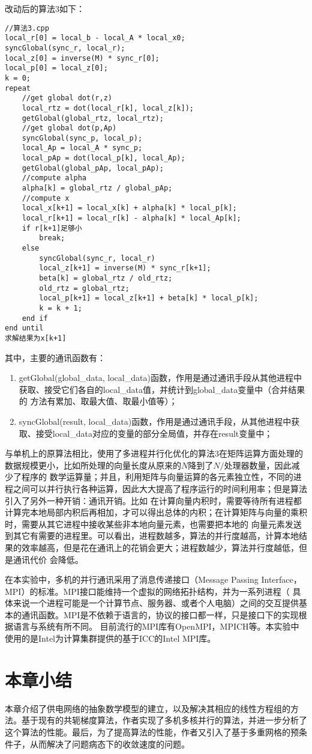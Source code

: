 改动后的算法3如下：
\begin{lstlisting}
//算法3.cpp
local_r[0] = local_b - local_A * local_x0;
syncGlobal(sync_r, local_r);
local_z[0] = inverse(M) * sync_r[0];
local_p[0] = local_z[0];
k = 0;
repeat
    //get global dot(r,z)
    local_rtz = dot(local_r[k], local_z[k]);
    getGlobal(global_rtz, local_rtz);
    //get global dot(p,Ap)
    syncGlobal(sync_p, local_p);
    local_Ap = local_A * sync_p;
    local_pAp = dot(local_p[k], local_Ap);
    getGlobal(global_pAp, local_pAp);
    //compute alpha
    alpha[k] = global_rtz / global_pAp;
    //compute x
    local_x[k+1] = local_x[k] + alpha[k] * local_p[k];
    local_r[k+1] = local_r[k] - alpha[k] * local_Ap[k];
    if r[k+1]足够小
        break;
    else
        syncGlobal(sync_r, local_r)
        local_z[k+1] = inverse(M) * sync_r[k+1];
        beta[k] = global_rtz / old_rtz;
        old_rtz = global_rtz;
        local_p[k+1] = local_z[k+1] + beta[k] * local_p[k];
        k = k + 1;
    end if
end until
求解结果为x[k+1]
\end{lstlisting}
其中，主要的通讯函数有：
\begin{enumerate}
    \item getGlobal(global\_data, local\_data)函数，作用是通过通讯手段从其他进程中获取、接受它们各自的local\_data值，并统计到global\_data变量中（合并结果的
    方法有累加、取最大值、取最小值等）；
    \item syncGlobal(result, local\_data)函数，作用是通过通讯手段，从其他进程中获取、接受local\_data对应的变量的部分全局值，并存在result变量中；
\end{enumerate}

与单机上的原算法相比，使用了多进程并行化优化的算法3在矩阵运算方面处理的数据规模更小，比如所处理的向量长度从原来的$N$降到了$N/\text{处理器数量}$，因此减少了程序的
数学运算量；并且，利用矩阵与向量运算的各元素独立性，不同的进程之间可以并行执行各种运算，因此大大提高了程序运行的时间利用率；但是算法引入了另外一种开销：通讯开销。比如
在计算向量内积时，需要等待所有进程都计算完本地局部内积后再相加，才可以得出总体的内积；在计算矩阵与向量的乘积时，需要从其它进程中接收某些非本地向量元素，也需要把本地的
向量元素发送到其它有需要的进程里。可以看出，进程数越多，算法的并行度越高，计算本地结果的效率越高，但是花在通讯上的花销会更大；进程数越少，算法并行度越低，但是通讯代价
会降低。

在本实验中，多机的并行通讯采用了消息传递接口（Message Passing Interface，MPI）的标准。MPI接口能维持一个虚拟的网络拓扑结构，并为一系列进程（
具体来说一个进程可能是一个计算节点、服务器、或者个人电脑）之间的交互提供基本的通讯函数。MPI是不依赖于语言的，协议的接口都一样，只是接口下的实现根据语言与系统有所不同。
目前流行的MPI库有OpenMPI，MPICH等。本实验中使用的是Intel为计算集群提供的基于ICC的Intel MPI库。

\section{本章小结}

本章介绍了供电网络的抽象数学模型的建立，以及解决其相应的线性方程组的方法。基于现有的共轭梯度算法，作者实现了多机多核并行的算法，并进一步分析了这个算法的性能。最后，为了提高算法的性能，作者又引入了基于多重网格的预条件子，从而解决了问题病态下的收敛速度的问题。
